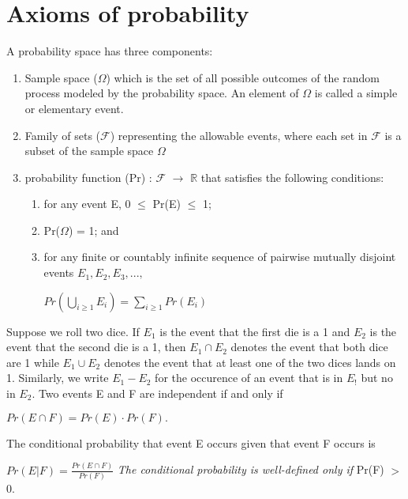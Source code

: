 \documentclass{book}
\begin{document}
\section{Axioms of probability}
A probability space has three components:
\begin{enumerate}
\item Sample space ($\Omega$) which is the set of all possible outcomes of the random process modeled by the probability space. An element of $\Omega$ is called a simple or elementary event. 
\item Family of sets ($\mathcal{F}$) representing the allowable events, where each set in $\mathcal{F}$ is a subset of the sample space $\Omega$ 
\item probability function (Pr) : $\mathcal{F}$ $\rightarrow$ $\mathbb{R}$ that satisfies the following conditions:
\begin{enumerate}
\item for any event E, 0 $\leq$ Pr(E) $\leq$ 1;
\item Pr($\Omega$) = 1; and
\item for any finite or countably infinite sequence of pairwise mutually disjoint events $E_1, E_2, E_3,...,$
\newline
\begin{center}
$Pr \left(\bigcup_{i\geq1}^{} E_i\right) = \sum_{i\geq1}^{}Pr(E_i)$
\end{center} 
\end{enumerate}
\end{enumerate}
Suppose we roll two dice. If $E_1$ is the event that the first die is a 1 and $E_2$ is the event that the second die is a 1, then $E_1\cap E_2$ denotes the event that both dice are 1 while $E_1\cup E_2$ denotes the event that at least one of the two dices lands on 1. Similarly, we write $E_1-E_2$ for the occurence of an event that is in $E_!$ but no in $E_2$.
\newline\newline
Two events E and F are independent if and only if 
\begin{center}
$Pr(E\cap F) = Pr(E) \cdot Pr(F).$
\end{center}
\newpage
The conditional probability that event E occurs given that event F occurs is
\begin{center}
$Pr(E|F) = \tfrac{Pr(E\cap F)}{Pr(F)}$
\newline
\newline
\emph{The conditional probability is well-defined only if} Pr(F) $>$ 0.
\end{center}
\end{document}
